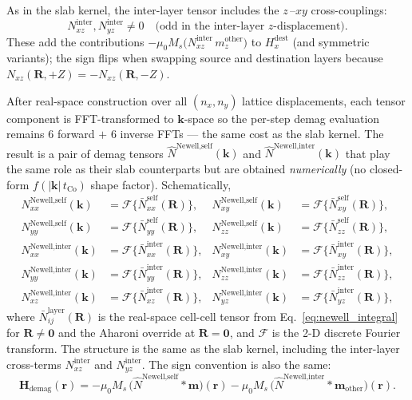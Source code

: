 \documentclass[11pt,a4paper]{article}
\newcommand{\mb}[1]{\mathbf{#1}}
\newcommand{\Hdemag}{\mb{H}_{\text{demag}}}
\newcommand{\tCo}{t_{\text{Co}}}
\newcommand{\Ms}{M_s}
\begin{document}
As in the slab kernel, the inter-layer tensor includes the
$z$\,--$xy$ cross-couplings:
%
\begin{equation}
N^{\text{inter}}_{xz}, N^{\text{inter}}_{yz} \neq 0
\quad\text{(odd in the inter-layer } z\text{-displacement)} .
\end{equation}
%
These add the contributions
$-\mu_0 \Ms\bigl(N_{xz}^{\text{inter}}\, m^{\text{other}}_z\bigr)$ to
$H_x^{\text{dest}}$ (and symmetric variants); the sign flips when
swapping source and destination layers because
$N_{xz}(\mb{R}, +Z) = -N_{xz}(\mb{R}, -Z)$.

After real-space construction over all $(n_x, n_y)$ lattice
displacements, each tensor component is FFT-transformed to
$\mb{k}$-space so the per-step demag evaluation remains
6 forward $+$ 6 inverse FFTs --- the same cost as the slab
kernel.  The result is a pair of demag tensors
$\hat N^{\text{Newell,self}}(\mb{k})$ and
$\hat N^{\text{Newell,inter}}(\mb{k})$ that play the same
role as their slab counterparts but are obtained
\emph{numerically} (no closed-form
$f(|\mb{k}|\,\tCo)$ shape factor).  Schematically,
%
\begin{align}
N^{\text{Newell,self}}_{xx}(\mb{k}) &=
    \mathcal{F}\bigl\{\bar N_{xx}^{\text{self}}(\mb{R})\bigr\},
&
N^{\text{Newell,self}}_{xy}(\mb{k}) &=
    \mathcal{F}\bigl\{\bar N_{xy}^{\text{self}}(\mb{R})\bigr\}, \\
N^{\text{Newell,self}}_{yy}(\mb{k}) &=
    \mathcal{F}\bigl\{\bar N_{yy}^{\text{self}}(\mb{R})\bigr\},
&
N^{\text{Newell,self}}_{zz}(\mb{k}) &=
    \mathcal{F}\bigl\{\bar N_{zz}^{\text{self}}(\mb{R})\bigr\}, \\
N^{\text{Newell,inter}}_{xx}(\mb{k}) &=
    \mathcal{F}\bigl\{\bar N_{xx}^{\text{inter}}(\mb{R})\bigr\},
&
N^{\text{Newell,inter}}_{xy}(\mb{k}) &=
    \mathcal{F}\bigl\{\bar N_{xy}^{\text{inter}}(\mb{R})\bigr\}, \\
N^{\text{Newell,inter}}_{yy}(\mb{k}) &=
    \mathcal{F}\bigl\{\bar N_{yy}^{\text{inter}}(\mb{R})\bigr\},
&
N^{\text{Newell,inter}}_{zz}(\mb{k}) &=
    \mathcal{F}\bigl\{\bar N_{zz}^{\text{inter}}(\mb{R})\bigr\}, \\
N^{\text{Newell,inter}}_{xz}(\mb{k}) &=
    \mathcal{F}\bigl\{\bar N_{xz}^{\text{inter}}(\mb{R})\bigr\},
&
N^{\text{Newell,inter}}_{yz}(\mb{k}) &=
    \mathcal{F}\bigl\{\bar N_{yz}^{\text{inter}}(\mb{R})\bigr\},
\end{align}
%
where $\bar N_{ij}^{\text{layer}}(\mb{R})$ is the real-space
cell-cell tensor from Eq.~\eqref{eq:newell_integral} for
$\mb{R} \neq \mb{0}$ and the Aharoni override at
$\mb{R} = \mb{0}$, and $\mathcal{F}$ is the 2-D discrete
Fourier transform.  The structure is the same as the slab kernel, including the
inter-layer cross-terms $N_{xz}^{\text{inter}}$ and
$N_{yz}^{\text{inter}}$.  The sign convention is also the
same:
%
\begin{equation}
\Hdemag(\mb{r}) =
    -\mu_0 \Ms \,
    \bigl(\hat N^{\text{Newell,self}} * \mb{m}\bigr)(\mb{r})
    -\mu_0 \Ms \,
    \bigl(\hat N^{\text{Newell,inter}} * \mb{m}_{\text{other}}\bigr)(\mb{r}).
\end{equation}
\end{document}
